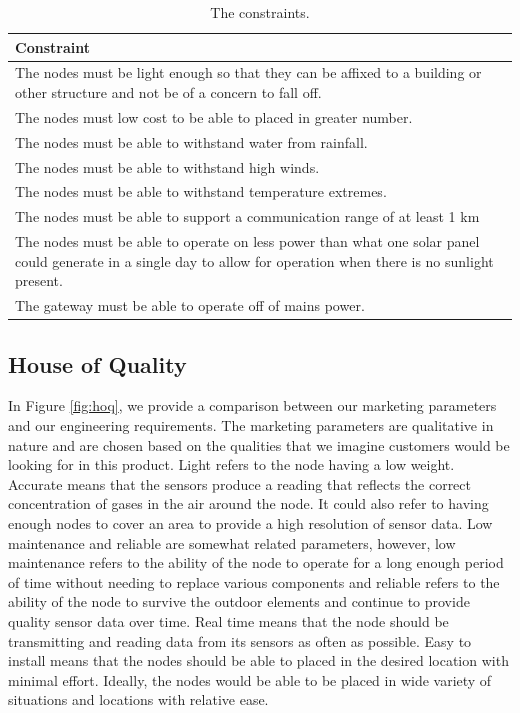 \begin{table}[H]
\centering
\caption{The constraints.}
\begin{tabularx}{\linewidth}{|X|}
\hline
Constraint \\
\hline
The nodes must be light enough so that they can be affixed to a building or other structure and not be of a concern to fall off.\\\hline
The nodes must low cost to be able to placed in greater number. \\\hline
The nodes must be able to withstand water from rainfall.\\\hline
The nodes must be able to withstand high winds. \\\hline
The nodes must be able to withstand temperature extremes. \\\hline
The nodes must be able to support a communication range of at least 1 km\\\hline
The nodes must be able to operate on less power than what one solar panel could generate in a single day to allow for operation when there is no sunlight present.\\\hline
The gateway must be able to operate off of mains power.\\\hline
\end{tabularx}
\label{tab:constraints}
\end{table}

\subsection{House of Quality}
In Figure \ref{fig:hoq}, we provide a comparison between our marketing parameters and our engineering requirements. The marketing parameters are qualitative in nature and are chosen based on the qualities that we imagine customers would be looking for in this product. Light refers to the node having a low weight. Accurate means that the sensors produce a reading that reflects the correct concentration of gases in the air around the node. It could also refer to having enough nodes to cover an area to provide a high resolution of sensor data. Low maintenance and reliable are somewhat related parameters, however, low maintenance refers to the ability of the node to operate for a long enough period of time without needing to replace various components and reliable refers to the ability of the node to survive the outdoor elements and continue to provide quality sensor data over time. Real time means that the node should be transmitting and reading data from its sensors as often as possible. Easy to install means that the nodes should be able to placed in the desired location with minimal effort. Ideally, the nodes would be able to be placed in wide variety of situations and locations with relative ease.

